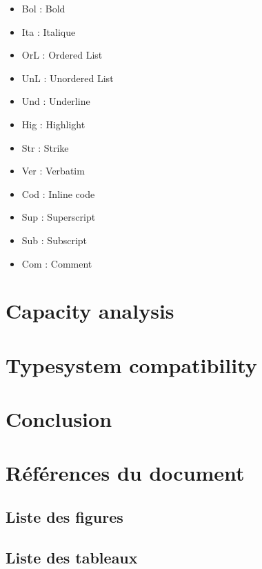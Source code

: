 \documentclass[a4paper,12pt]{article}
\begin{document}
\begin{tablenotes}
\begin{multicols}{3}\small
\begin{itemize}
  \item Bol : Bold
  \item Ita : Italique
  \item OrL : Ordered List
  \item UnL : Unordered List
  \item Und : Underline
  \item Hig : Highlight
  \item Str : Strike
  \item Ver : Verbatim
  \item Cod : Inline code
  \item Sup : Superscript
  \item Sub : Subscript
  \item Com : Comment
\end{itemize}
\end{multicols}
\end{tablenotes}
\section{Capacity analysis}
\label{sec:org5487cb2}

\section{Typesystem compatibility}
\label{sec:org1c31b4f}
\section{Conclusion}
\label{sec:orgc580352}

\clearpage
\section{Références du document}
\label{sec:org6c5a205}
\subsection{Liste des figures}
\label{sec:org6c6d046}
\renewcommand{\listfigurename}{\vspace{-2em}}
\listoffigures
\subsection{Liste des tableaux}
\label{sec:org7b2f855}
\renewcommand{\listtablename}{\vspace{-2em}}
\listoftables
\end{document}
